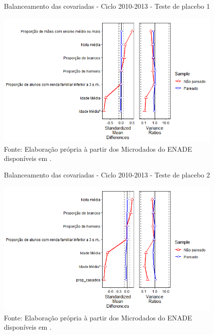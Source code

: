 \begin{figure}[H]
	\centering
	\caption{Balanceamento das covariadas - Ciclo 2010-2013 - Teste de placebo 1}
	\label{fig:balanceamento_covariadas_2010_2013_placebo_1}
	\includegraphics[width=0.7\linewidth]{"Figuras/balanceamento_covariadas_2010_2013_placebo1.png"}
	\caption*{\RaggedRight Fonte: Elaboração própria à partir dos Microdados do ENADE disponíveis em \cite{INEP2020}.}
\end{figure}

\begin{figure}[H]
	\centering
	\caption{Balanceamento das covariadas - Ciclo 2010-2013 - Teste de placebo 2}
	\label{fig:balanceamento_covariadas_2010_2013_placebo_2}
	\includegraphics[width=0.7\linewidth]{"Figuras/balanceamento_covariadas_2010_2013_placebo2.png"}
	\caption*{\RaggedRight Fonte: Elaboração própria à partir dos Microdados do ENADE disponíveis em \cite{INEP2020}.}
\end{figure}


